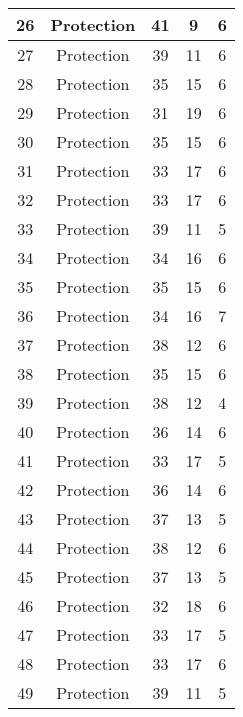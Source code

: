 \documentclass[results.tex]{subfiles}
\begin{document}
\begin{center}
\begin{tabular}{| c || c | c | c | c |}
    \hline
    26 & Protection & 41 & 9 & 6 \\ 
    \hline
    27 & Protection & 39 & 11 & 6 \\ 
    \hline
    28 & Protection & 35 & 15 & 6 \\ 
    \hline
    29 & Protection & 31 & 19 & 6 \\ 
    \hline
    30 & Protection & 35 & 15 & 6 \\ 
    \hline
    31 & Protection & 33 & 17 & 6 \\ 
    \hline
    32 & Protection & 33 & 17 & 6 \\ 
    \hline
    33 & Protection & 39 & 11 & 5 \\ 
    \hline
    34 & Protection & 34 & 16 & 6 \\ 
    \hline
    35 & Protection & 35 & 15 & 6 \\ 
    \hline
    36 & Protection & 34 & 16 & 7 \\ 
    \hline
    37 & Protection & 38 & 12 & 6 \\ 
    \hline
    38 & Protection & 35 & 15 & 6 \\ 
    \hline
    39 & Protection & 38 & 12 & 4 \\ 
    \hline
    40 & Protection & 36 & 14 & 6 \\ 
    \hline
    41 & Protection & 33 & 17 & 5 \\ 
    \hline
    42 & Protection & 36 & 14 & 6 \\ 
    \hline
    43 & Protection & 37 & 13 & 5 \\ 
    \hline
    44 & Protection & 38 & 12 & 6 \\ 
    \hline
    45 & Protection & 37 & 13 & 5 \\ 
    \hline
    46 & Protection & 32 & 18 & 6 \\ 
    \hline
    47 & Protection & 33 & 17 & 5 \\ 
    \hline
    48 & Protection & 33 & 17 & 6 \\ 
    \hline
    49 & Protection & 39 & 11 & 5 \\ 
    \hline   \end{tabular}
\end{center}
\end{document}

